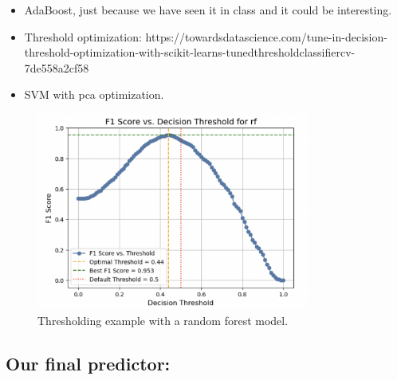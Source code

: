 \documentclass{article}
\begin{document}
\begin{itemize}
    \item AdaBoost, just because we have seen it in class and it could be interesting.
    \item Threshold optimization: https://towardsdatascience.com/tune-in-decision-threshold-optimization-with-scikit-learns-tunedthresholdclassifiercv-7de558a2cf58
    \item SVM with pca optimization.
\end{itemize}

\begin{figure}[h]
    \centering
    \includegraphics[width=0.8\textwidth]{RF_THRESHOLD_DEF.png}
    \caption{Thresholding example with a random forest model.}\label{fig:thresh_rf}
\end{figure}
\subsection{Our final predictor:}
\end{document}
